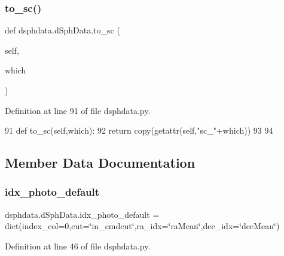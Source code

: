 \subsubsection{\texorpdfstring{to\+\_\+sc()}{to\_sc()}}
{\footnotesize\ttfamily def dsphdata.\+d\+Sph\+Data.\+to\+\_\+sc (\begin{DoxyParamCaption}\item[{}]{self,  }\item[{}]{which }\end{DoxyParamCaption})}



Definition at line 91 of file dsphdata.\+py.


\begin{DoxyCode}
91     \textcolor{keyword}{def }to\_sc(self,which):
92         \textcolor{keywordflow}{return} copy(getattr(self,\textcolor{stringliteral}{"sc\_"}+which))
93         
94         
\end{DoxyCode}


\subsection{Member Data Documentation}
\mbox{\label{classdsphdata_1_1dSphData_a1ebfbfbd27ed84f68b401606530c35ef}} 
\subsubsection{\texorpdfstring{idx\+\_\+photo\+\_\+default}{idx\_photo\_default}}
{\footnotesize\ttfamily dsphdata.\+d\+Sph\+Data.\+idx\+\_\+photo\+\_\+default = dict(index\+\_\+col=0,cut=\char`\"{}in\+\_\+cmdcut\char`\"{},ra\+\_\+idx=\char`\"{}ra\+Mean\char`\"{},dec\+\_\+idx=\char`\"{}dec\+Mean\char`\"{})\hspace{0.3cm}{\ttfamily [static]}}



Definition at line 46 of file dsphdata.\+py.

\mbox{\label{classdsphdata_1_1dSphData_aaebb5308a014e2064f325f1897ae366a}} 
